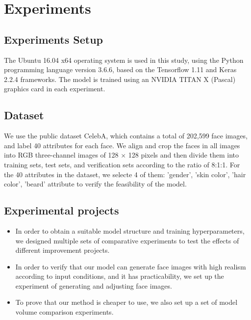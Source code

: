 \section{Experiments}

\subsection{Experiments Setup}
The Ubuntu 16.04 x64 operating system is used in this study, using the Python programming language version 3.6.6, based on the Tensorflow 1.11 and Keras 2.2.4 frameworks. The model is trained using an NVIDIA TITAN X (Pascal) graphics card in each experiment.

\subsection{Dataset}
We use the public dataset CelebA, which contains a total of 202,599 face images, and label 40 attributes for each face. We align and crop the faces in all images into RGB three-channel images of 128 × 128 pixels and then divide them into training sets, test sets, and verification sets according to the ratio of 8:1:1. 
For the 40 attributes in the dataset, we selecte 4 of them: 'gender', 'skin color', 'hair color', 'beard' attribute to verify the feasibility of the model.

\subsection{Experimental projects}
\begin{itemize}
\item In order to obtain a suitable model structure and training hyperparameters, we designed multiple sets of comparative experiments to test the effects of different improvement projects.
\item In order to verify that our model can generate face images with high realism according to input conditions, and it has practicability, we set up the experiment of generating and adjusting face images.
\item To prove that our method is cheaper to use, we also set up a set of model volume comparison experiments.
\end{itemize}

